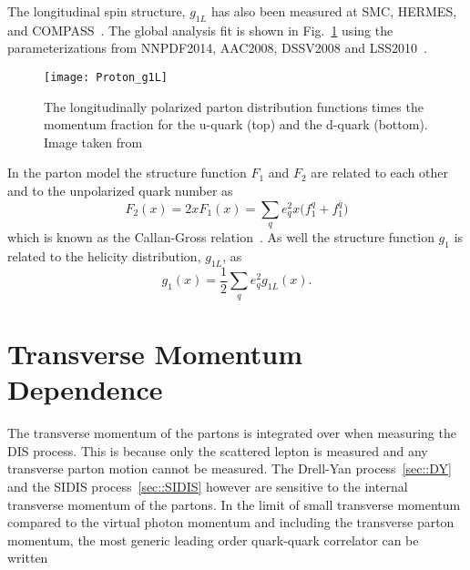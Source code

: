The longitudinal spin structure, $g_{1L}$ has also been measured at SMC, HERMES,
and COMPASS~\cite{Adeva:1997is,PhysRevLett.92.012005,Savin:2011zz}.  The global
analysis fit is shown in Fig.~\ref{fig::Proton_g1L} using the parameterizations
from NNPDF2014, AAC2008, DSSV2008 and
LSS2010~\cite{Harland-Lang:2016yfn,Abt:2016vjh,Nocera:2014gqa,Hirai:2008aj}.

\begin{figure}[h!t]
  \centering \texttt{[image: Proton\_g1L]}
  \caption{The longitudinally polarized parton distribution functions times the
    momentum fraction for the u-quark (top) and the d-quark (bottom).  Image
    taken from~\cite{Tanabashi:2018oca}}
  \label{fig::Proton_g1L}
\end{figure}

In the parton model the structure function $F_1$ and $F_2$ are related to each
other and to the unpolarized quark number as
\begin{equation}
  F_2(x) = 2xF_1(x) = \sum_q e_q^2x\Big(f^q_1 + f^{\bar{q}}_1 \Big)
\end{equation}
which is known as the Callan-Gross relation~\cite{PhysRevLett.22.156}.  As well
the structure function $g_1$ is related to the helicity distribution, $g_{1L}$,
as
\begin{equation}
  g_1(x) = \frac{1}{2} \sum_q e^2_q g_{1L}(x).
\end{equation}


\section{Transverse Momentum Dependence}
The transverse momentum of the partons is integrated over when measuring the DIS
process.  This is because only the scattered lepton is measured and any
transverse parton motion cannot be measured.  The Drell-Yan
process~\ref{sec::DY} and the SIDIS process~\ref{sec::SIDIS} however are
sensitive to the internal transverse momentum of the partons.  In the limit of
small transverse momentum compared to the virtual photon momentum and including
the transverse parton momentum, the most generic leading order quark-quark
correlator can be written~\cite{Mulders:1995dh,Boer:1997nt,Bacchetta:2006tn}


